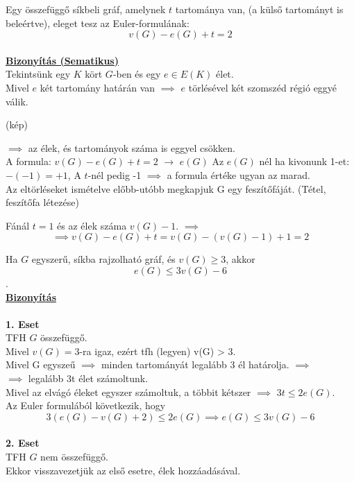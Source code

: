 \begin{frame}
\begin{tcolorbox}[title={Tétel: Euler formula}]
Egy összefüggő síkbeli gráf, amelynek $t$ tartománya van, (a külső tartományt is beleértve), eleget tesz az Euler-formulának:
$$v(G) - e(G) + t = 2$$\\
\tcblower
\msmallskip
\underline{\textbf{Bizonyítás (Sematikus)}}\\
\mmedskip
Tekintsünk egy $K$ kört $G$-ben és egy $e \in E(K)$ élet.\\
Mivel $e$ két tartomány határán van $\implies$ $e$ törlésével két szomszéd régió eggyé válik.

(kép)

$\implies$ az élek, és tartományok száma is eggyel csökken.\\
A formula: $v(G) - e(G) + t = 2$ $\rightarrow$ $e(G)$ Az $e(G)$ nél ha kivonunk 1-et: $-(-1) = +1$, A $t$-nél pedig -1 $\implies$ a formula értéke ugyan az marad.\\

Az eltörléseket ismételve előbb-utóbb megkapjuk G egy feszítőfáját. (Tétel, feszítőfa létezése)

Fánál $t = 1$ és az élek száma $v(G) - 1$. $\implies$
$$\implies v(G) - e(G) + t = v(G) - (v(G) - 1) + 1 = 2$$

\end{tcolorbox}
\end{frame}

\begin{frame}
\begin{tcolorbox}[title={Tétel: Síkgráf élszáma}]
Ha $G$ egyszerű, síkba rajzolható gráf, és $v(G) \geq 3$, akkor $$e(G) \leq 3v(G) - 6$$.\\
\tcblower
\msmallskip
\underline{\textbf{Bizonyítás}}\\
\mmedskip
\\
\textbf{1. Eset}\\
TFH $G$ összefüggő.\\
Mivel $v(G) = 3$-ra igaz, ezért tfh (legyen) v(G) > 3.\\
Mivel G egyszeű $\implies$ minden tartományát legalább 3 él határolja. $\implies$\\
$\implies$ legalább 3t élet számoltunk.\\
Mivel az elvágó éleket egyszer számoltuk, a többit kétszer $\implies$ $3t \leq 2e(G)$.\\
Az Euler formulából következik, hogy $$3(e(G) - v(G) + 2) \leq 2e(G) \implies e(G) \leq 3v(G) - 6$$\\
\msmallskip
\textbf{2. Eset}\\
TFH $G$ nem összefüggő.\\
Ekkor visszavezetjük az első esetre, élek hozzáadásával.
\end{tcolorbox}
\end{frame}

